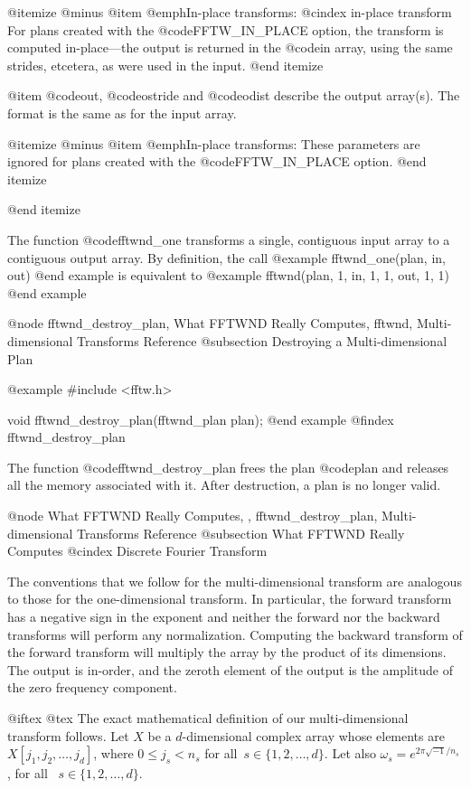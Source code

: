 @itemize @minus
@item @emph{In-place transforms}:
@cindex in-place transform
For plans created with the @code{FFTW_IN_PLACE} option, the transform is
computed in-place---the output is returned in the @code{in} array, using
the same strides, etcetera, as were used in the input.
@end itemize

@item
@code{out}, @code{ostride} and @code{odist} describe the output array(s).
The format is the same as for the input array.

@itemize @minus
@item @emph{In-place transforms}:
These parameters are ignored for plans created with the
@code{FFTW_IN_PLACE} option.
@end itemize

@end itemize

The function @code{fftwnd_one} transforms a single, contiguous input
array to a contiguous output array.  By definition, the call
@example
fftwnd_one(plan, in, out)
@end example
is equivalent to
@example
fftwnd(plan, 1, in, 1, 1, out, 1, 1)
@end example

@node    fftwnd_destroy_plan, What FFTWND Really Computes, fftwnd, Multi-dimensional Transforms Reference
@subsection Destroying a Multi-dimensional Plan

@example
#include <fftw.h>

void fftwnd_destroy_plan(fftwnd_plan plan);
@end example
@findex fftwnd_destroy_plan

The function @code{fftwnd_destroy_plan} frees the plan @code{plan}
and releases all the memory associated with it.  After destruction,
a plan is no longer valid.

@node What FFTWND Really Computes,  , fftwnd_destroy_plan, Multi-dimensional Transforms Reference
@subsection What FFTWND Really Computes
@cindex Discrete Fourier Transform

The conventions that we follow for the multi-dimensional transform are
analogous to those for the one-dimensional transform. In particular, the
forward transform has a negative sign in the exponent and neither the
forward nor the backward transforms will perform any normalization.
Computing the backward transform of the forward transform will multiply
the array by the product of its dimensions.  The output is in-order, and
the zeroth element of the output is the amplitude of the zero frequency
component.

@iftex
@tex
The exact mathematical definition of our multi-dimensional transform
follows.  Let $X$ be a $d$-dimensional complex array whose elements are
$X[j_1, j_2, \ldots, j_d]$, where $0 \leq j_s < n_s$ for all~$s \in \{
1, 2, \ldots, d \}$.  Let also $\omega_s = e^{2\pi \sqrt{-1}/n_s}$, for
all ~$s \in \{ 1, 2, \ldots, d \}$.

